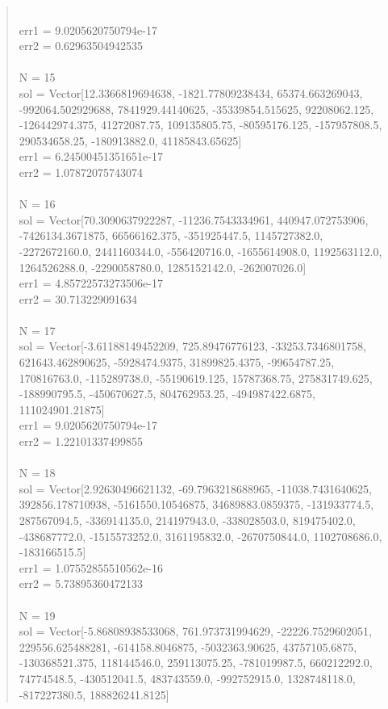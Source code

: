 \documentclass[letterpaper,12pt]{article}
\begin{document}
\begin{quote}
\\err1 = 9.0205620750794e-17
\\err2 = 0.62963504942535
\\
\\N = 15
\\sol = Vector[12.3366819694638, -1821.77809238434, 65374.663269043, -992064.502929688, 7841929.44140625, -35339854.515625, 92208062.125, -126442974.375, 41272087.75, 109135805.75, -80595176.125, -157957808.5, 290534658.25, -180913882.0, 41185843.65625]
\\err1 = 6.24500451351651e-17
\\err2 = 1.07872075743074
\\
\\N = 16
\\sol = Vector[70.3090637922287, -11236.7543334961, 440947.072753906, -7426134.3671875, 66566162.375, -351925447.5, 1145727382.0, -2272672160.0, 2441160344.0, -556420716.0, -1655614908.0, 1192563112.0, 1264526288.0, -2290058780.0, 1285152142.0, -262007026.0]
\\err1 = 4.85722573273506e-17
\\err2 = 30.713229091634
\\
\\N = 17
\\sol = Vector[-3.61188149452209, 725.89476776123, -33253.7346801758, 621643.462890625, -5928474.9375, 31899825.4375, -99654787.25, 170816763.0, -115289738.0, -55190619.125, 15787368.75, 275831749.625, -188990795.5, -450670627.5, 804762953.25, -494987422.6875, 111024901.21875]
\\err1 = 9.0205620750794e-17
\\err2 = 1.22101337499855
\\
\\N = 18
\\sol = Vector[2.92630496621132, -69.7963218688965, -11038.7431640625, 392856.178710938, -5161550.10546875, 34689883.0859375, -131933774.5, 287567094.5, -336914135.0, 214197943.0, -338028503.0, 819475402.0, -438687772.0, -1515573252.0, 3161195832.0, -2670750844.0, 1102708686.0, -183166515.5]
\\err1 = 1.07552855510562e-16
\\err2 = 5.73895360472133
\\
\\N = 19
\\sol = Vector[-5.86808938533068, 761.973731994629, -22226.7529602051, 229556.625488281, -614158.8046875, -5032363.90625, 43757105.6875, -130368521.375, 118144546.0, 259113075.25, -781019987.5, 660212292.0, 74774548.5, -430512041.5, 483743559.0, -992752915.0, 1328748118.0, -817227380.5, 188826241.8125]

\end{quote}
\end{document}
